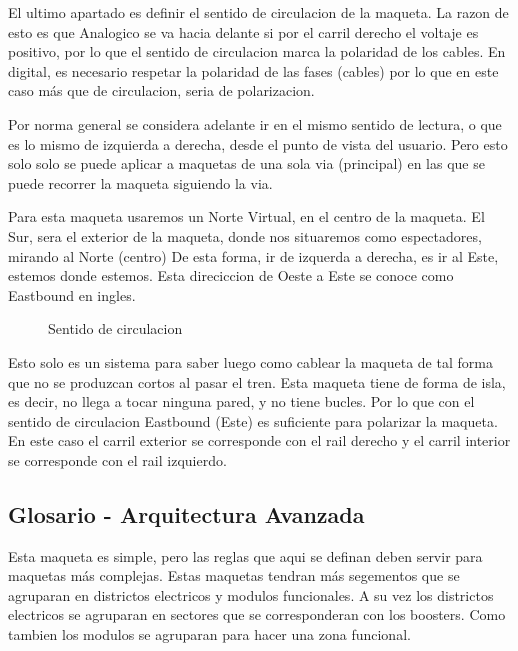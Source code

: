 El ultimo apartado es definir el sentido de circulacion de la maqueta.
La razon de esto es que Analogico se va hacia delante si por el carril derecho
el voltaje es positivo, por lo que el sentido de circulacion marca la polaridad
de los cables. En digital, es necesario respetar la polaridad de las fases (cables)
por lo que en este caso más que de circulacion, seria de polarizacion.

Por norma general se considera adelante ir en el mismo sentido de lectura, o que es
lo mismo de izquierda a derecha, desde el punto de vista del usuario. Pero esto solo
solo se puede aplicar a maquetas de una sola via (principal) en las que se puede
recorrer la maqueta siguiendo la via.

Para esta maqueta usaremos un Norte Virtual, en el centro de la maqueta. El Sur, sera
el exterior de la maqueta, donde nos situaremos como espectadores, mirando al Norte (centro)
De esta forma, ir de izquerda a derecha, es ir al Este, estemos donde estemos.
Esta direciccion de Oeste a Este se conoce como Eastbound en ingles.

\begin{figure}[H]
    \centering
    
    \caption{Sentido de circulacion}
    \label{fig:Sentidos}
\end{figure}

Esto solo es un sistema para saber luego como cablear la maqueta de tal forma
que no se produzcan cortos al pasar el tren. 
Esta maqueta tiene de forma de isla, es decir, no llega a tocar ninguna pared, y no tiene
bucles. Por lo que con el sentido de circulacion Eastbound (Este) es suficiente para polarizar
la maqueta. En este caso el carril exterior se corresponde con el rail derecho y el carril interior
se corresponde con el rail izquierdo.  

\subsection{Glosario - Arquitectura Avanzada}
Esta maqueta es simple, pero las reglas que aqui se definan deben servir para maquetas más complejas. Estas maquetas tendran más segementos que se agruparan en districtos electricos y modulos funcionales. A su vez los districtos electricos se agruparan en sectores que se corresponderan con los boosters. Como tambien los modulos se agruparan para hacer una zona funcional.

